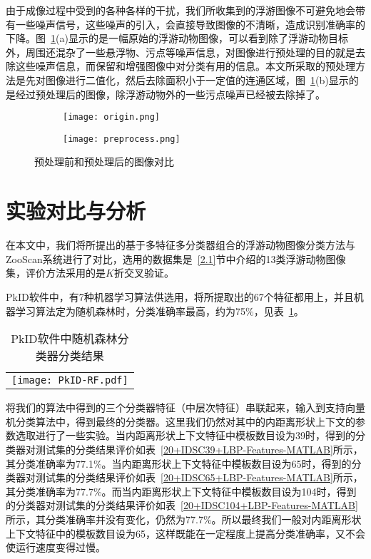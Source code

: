由于成像过程中受到的各种各样的干扰，我们所收集到的浮游图像不可避免地会带有一些噪声信号，这些噪声的引入，会直接导致图像的不清晰，造成识别准确率的下降。图~\ref{fig: origin_preprocess}(a)显示的是一幅原始的浮游动物图像，可以看到除了浮游动物目标外，周围还混杂了一些悬浮物、污点等噪声信息，对图像进行预处理的目的就是去除这些噪声信息，而保留和增强图像中对分类有用的信息。本文所采取的预处理方法是先对图像进行二值化，然后去除面积小于一定值的连通区域，图~\ref{fig: origin_preprocess}(b)显示的是经过预处理后的图像，除浮游动物外的一些污点噪声已经被去除掉了。

\begin{figure}[t]
  \centering%
  \begin{subfigure}{0.3\linewidth}
    \texttt{[image: origin.png]}
    \caption{}
  \end{subfigure}
  \hspace{4em}%
  \begin{subfigure}{0.3\linewidth}
    \texttt{[image: preprocess.png]}
    \caption{}
  \end{subfigure}
  \caption{预处理前和预处理后的图像对比}
  \label{fig: origin_preprocess}
\end{figure}

\section{实验对比与分析}

在本文中，我们将所提出的基于多特征多分类器组合的浮游动物图像分类方法与ZooScan系统进行了对比，选用的数据集是~\ref{2.1}节中介绍的13类浮游动物图像集，评价方法采用的是$K$折交叉验证。

PkID软件中，有7种机器学习算法供选用，将所提取出的67个特征都用上，并且机器学习算法定为随机森林时，分类准确率最高，约为75\%，见表~\ref{PkID-RF}。

\begin{table}
\centering
\caption{PkID软件中随机森林分类器分类结果}
\begin{tabular}{c}
\texttt{[image: PkID-RF.pdf]}
\end{tabular}
\label{PkID-RF}
\end{table}

将我们的算法中得到的三个分类器特征（中层次特征）串联起来，输入到支持向量机分类算法中，得到最终的分类器。这里我们仍然对其中的内距离形状上下文的参数选取进行了一些实验。当内距离形状上下文特征中模板数目设为39时，得到的分类器对测试集的分类结果评价如表~\ref{20+IDSC39+LBP-Features-MATLAB}所示，其分类准确率为77.1\%。当内距离形状上下文特征中模板数目设为65时，得到的分类器对测试集的分类结果评价如表~\ref{20+IDSC65+LBP-Features-MATLAB}所示，其分类准确率为77.7\%。而当内距离形状上下文特征中模板数目设为104时，得到的分类器对测试集的分类结果评价如表~\ref{20+IDSC104+LBP-Features-MATLAB}所示，其分类准确率并没有变化，仍然为77.7\%。所以最终我们一般对内距离形状上下文特征中的模板数目设为65，这样既能在一定程度上提高分类准确率，又不会使运行速度变得过慢。

